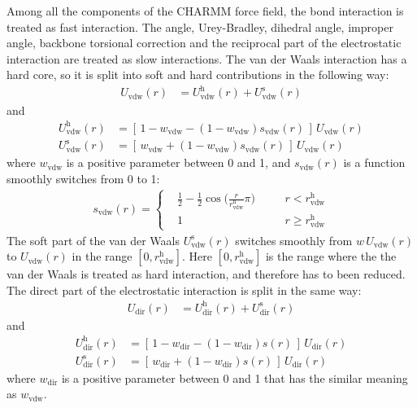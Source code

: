 \documentclass[aip,jcp,a4paper,reprint,onecolumn]{revtex4-1}
\newcommand{\hard}{\textrm{h}}
\newcommand{\soft}{\textrm{s}}
\newcommand{\vdw}{\textrm{vdw}}
\newcommand{\dir}{\textrm{dir}}
\begin{document}
\noindent
Among all the components of the CHARMM force field, the bond
interaction is treated as fast interaction. The angle, Urey-Bradley,
dihedral angle, improper angle, backbone torsional correction and the
reciprocal part of the electrostatic interaction are treated as slow
interactions. The van der Waals interaction has a hard core,
so it is split into soft and hard contributions in the following way:
\begin{align}
  U_{\vdw} (r) &= U^\hard_{\vdw}(r) + U^\soft_{\vdw}(r)
\end{align}
and
\begin{align}
  U^\hard_{\vdw}(r) & =  [\, 1-w_\vdw - (1 - w_\vdw) s_\vdw(r) \,] \,U_{\vdw}(r)\\
  U^\soft_{\vdw}(r) & =  [\, w_\vdw + (1 - w_\vdw) s_\vdw(r) \,] \,U_{\vdw}(r)
\end{align}
where $w_\vdw$ is a positive parameter between 0 and 1, and
$s_\vdw(r)$ is a function smoothly switches from 0 to 1:
\begin{align}
  s_\vdw(r) =
  \left\{
    \begin{aligned}
      &\frac12 - \frac12 \cos \Big(\frac{r}{r^\hard_\vdw} \pi\Big) &\quad & r < r^\hard_\vdw\\
      &1 & \quad & r \geq r^\hard_\vdw
    \end{aligned}
  \right.
\end{align}
The soft part of the van der Waals $U^\soft_{\vdw}(r)$ switches
smoothly from $w\,U_{\vdw}(r)$ to $U_{\vdw}(r)$ in the range
$[0, r^\hard_\vdw]$. Here $[0, r^\hard_\vdw]$ is the range where the the van der Waals is
treated as hard interaction, and therefore has to been reduced. The
direct part of the electrostatic interaction is split in the same way:
\begin{align}
  U_{\dir} (r) &= U^\hard_{\dir}(r) + U^\soft_{\dir}(r)
\end{align}
and
\begin{align}
  U^\hard_{\dir}(r) & =  [\, 1-w_\dir - (1 - w_\dir) s(r) \,] \,U_{\dir}(r)\\
  U^\soft_{\dir}(r) & =  [\, w_\dir + (1 - w_\dir) s(r) \,] \,U_{\dir}(r)
\end{align}
where $w_\dir$ is a positive parameter between 0 and 1 that
has the similar meaning as $w_\vdw$. \\
\end{document}
